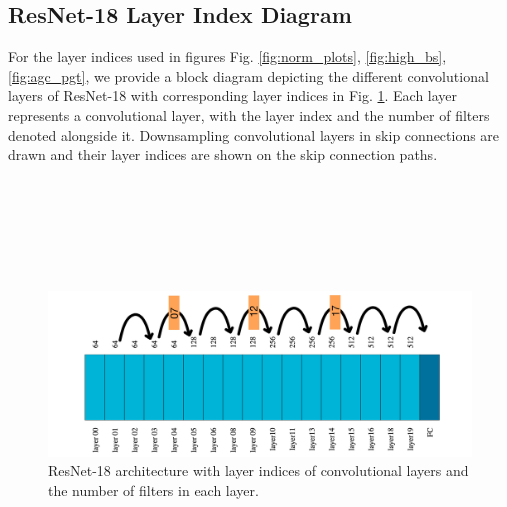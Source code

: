 \documentclass[times,sort&compress]{elsarticle}
\begin{document}
\newpage \subsection{ResNet-18 Layer Index Diagram}

For the layer indices used in figures Fig. \ref{fig:norm_plots}, \ref{fig:high_bs},
\ref{fig:agc_pgt}, we provide a block diagram depicting the different convolutional
layers of ResNet-18 with corresponding layer indices in Fig. \ref{fig:resnet18}. Each
layer represents a convolutional layer, with the layer index and the number of filters
denoted alongside it. Downsampling convolutional layers in skip connections are drawn
and their layer indices are shown on the skip connection paths.

\ \\ \ \\ \ \\ \ \\ \ \\ 

\begin{figure}[h] \centering \includegraphics[width=0.96\columnwidth]{drawing} \caption{
ResNet-18 architecture with layer indices of convolutional layers and the number of
filters in each layer. } \label{fig:resnet18} \end{figure}
\end{document}
